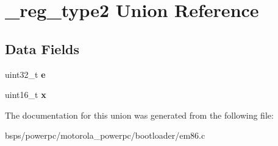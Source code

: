 \hypertarget{union__reg__type2}{}\section{\+\_\+reg\+\_\+type2 Union Reference}
\label{union__reg__type2}
\subsection*{Data Fields}
\begin{DoxyCompactItemize}
\item 
\mbox{\label{union__reg__type2_a0c0101c54458803ad387fea0124bd85a}} 
uint32\+\_\+t {\bfseries e}
\item 
\mbox{\label{union__reg__type2_a17911a1aad8b952fe0f31040214121b1}} 
uint16\+\_\+t {\bfseries x}
\end{DoxyCompactItemize}


The documentation for this union was generated from the following file\+:\begin{DoxyCompactItemize}
\item 
bsps/powerpc/motorola\+\_\+powerpc/bootloader/em86.\+c\end{DoxyCompactItemize}
